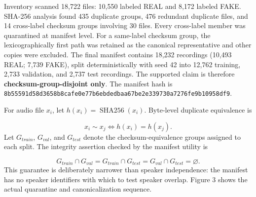 \documentclass[10pt,journal]{IEEEtran}
\begin{document}
Inventory scanned 18,722 files: 10,550 labeled REAL and 8,172 labeled FAKE. SHA-256 analysis found 435 duplicate groups, 476 redundant duplicate files, and 14 cross-label checksum groups involving 30 files. Every cross-label member was quarantined at manifest level. For a same-label checksum group, the lexicographically first path was retained as the canonical representative and other copies were excluded. The final manifest contains 18,232 recordings (10,493 REAL; 7,739 FAKE), split deterministically with seed 42 into 12,762 training, 2,733 validation, and 2,737 test recordings. The supported claim is therefore \textbf{checksum-group-disjoint only}. The manifest hash is \texttt{8b55591d58d3658b8cafe0e77b6ebdedbaa67be2e339730a7276fe9b10958df9}.

For audio file $x_i$, let $h(x_i)=\operatorname{SHA256}(x_i)$. Byte-level duplicate equivalence is

\begin{equation}
x_i\sim x_j\iff h(x_i)=h(x_j).
\end{equation}
Let $G_{train}$, $G_{val}$, and $G_{test}$ denote the checksum-equivalence groups assigned to each split. The integrity assertion checked by the manifest utility is

\begin{equation}
G_{train}\cap G_{val}=G_{train}\cap G_{test}=G_{val}\cap G_{test}=\varnothing.
\end{equation}
This guarantee is deliberately narrower than speaker independence: the manifest has no speaker identifiers with which to test speaker overlap. Figure 3 shows the actual quarantine and canonicalization sequence.
\end{document}
